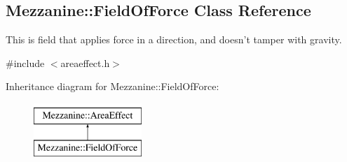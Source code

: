 \hypertarget{classMezzanine_1_1FieldOfForce}{
\subsection{Mezzanine::FieldOfForce Class Reference}
\label{classMezzanine_1_1FieldOfForce}
}


This is field that applies force in a direction, and doesn't tamper with gravity.  




{\ttfamily \#include $<$areaeffect.h$>$}

Inheritance diagram for Mezzanine::FieldOfForce:\begin{figure}[H]
\begin{center}
\leavevmode
\includegraphics[height=2.000000cm]{classMezzanine_1_1FieldOfForce}
\end{center}
\end{figure}
